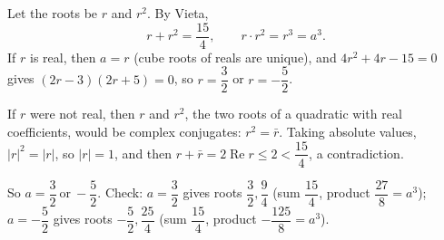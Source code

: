 Let the roots be $r$ and $r^2$. By Vieta,
\[r+r^2=\dfrac{15}{4},\qquad r\cdot r^2=r^3=a^3.\]
If $r$ is real, then $a=r$ (cube roots of reals are unique), and $4r^2+4r-15=0$ gives $(2r-3)(2r+5)=0$, so $r=\dfrac{3}{2}$ or $r=-\dfrac{5}{2}$.

If $r$ were not real, then $r$ and $r^2$, the two roots of a quadratic with real coefficients, would be complex conjugates: $r^2=\bar r$. Taking absolute values, $|r|^2=|r|$, so $|r|=1$, and then $r+\bar r=2\operatorname{Re}r\le2<\dfrac{15}{4}$, a contradiction.

So $a=\boxed{\dfrac{3}{2}\ \text{or}\ -\dfrac{5}{2}}$. Check: $a=\dfrac{3}{2}$ gives roots $\dfrac{3}{2},\dfrac{9}{4}$ (sum $\dfrac{15}{4}$, product $\dfrac{27}{8}=a^3$); $a=-\dfrac{5}{2}$ gives roots $-\dfrac{5}{2},\dfrac{25}{4}$ (sum $\dfrac{15}{4}$, product $-\dfrac{125}{8}=a^3$).
